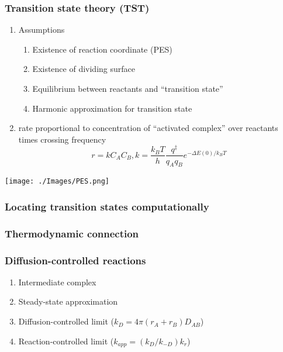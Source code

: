 \documentclass[11pt]{article}
\begin{document}
\subsubsection{Transition state theory (TST)}
\label{sec:org095981d}
\begin{enumerate}
\item Assumptions
\begin{enumerate}
\item Existence of reaction coordinate (PES)
\item Existence of dividing surface
\item Equilibrium between reactants and ``transition state''
\item Harmonic approximation for transition state
\end{enumerate}
\item rate proportional to concentration of ``activated complex'' over reactants times crossing frequency
\begin{displaymath}
   r = k C_A C_B , k = \frac{k_B T}{h} \frac{q^\ddagger}{q_A q_B}  e^{-{\Delta E(0)/k_BT}}
\end{displaymath}
\end{enumerate}

\begin{center}
\texttt{[image: ./Images/PES.png]}
\end{center}

\subsubsection{Locating transition states computationally}
\label{sec:orgbaf8e26}
\subsubsection{Thermodynamic connection}
\label{sec:orgb6aac4c}
\subsubsection{Diffusion-controlled reactions}
\label{sec:org97306e9}
\begin{enumerate}
\item Intermediate complex
\item Steady-state approximation
\item Diffusion-controlled limit (\(k_D = 4\pi (r_A + r_B) D_{AB}\))
\item Reaction-controlled limit (\(k_{app}=(k_D/k_{-D})k_r\))
\end{enumerate}
\end{document}
